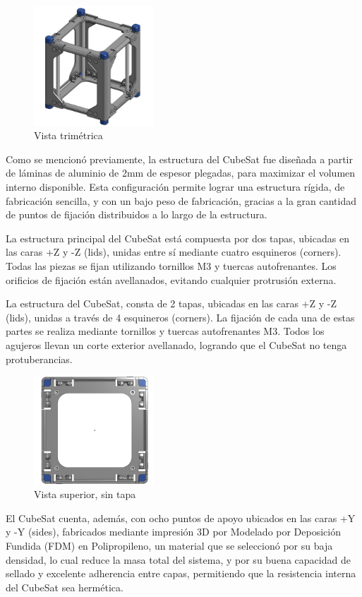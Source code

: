       \begin{figure}
        \centering
        \includegraphics[width=0.4\textwidth]{image/structure/partes.png}
        \caption{Vista trimétrica}
        \label{fig:trimetrica}
      \end{figure}
      Como se mencionó previamente, la estructura del CubeSat fue diseñada a partir de láminas de aluminio
      de 2mm de espesor plegadas, para maximizar el volumen interno disponible. Esta configuración permite
      lograr una estructura rígida, de fabricación sencilla, y con un bajo peso de fabricación, gracias a
      la gran cantidad de puntos de fijación distribuidos a lo largo de la estructura.

      La estructura principal del CubeSat está compuesta por dos tapas, ubicadas en las caras +Z y -Z
      (lids), unidas entre sí mediante cuatro esquineros (corners). Todas las piezas se fijan utilizando
      tornillos M3 y tuercas autofrenantes. Los orificios de fijación están avellanados, evitando cualquier
      protrusión externa.

      La estructura del CubeSat, consta de 2 tapas, ubicadas en las caras +Z y -Z (lids), unidas a través
      de 4 esquineros (corners). La fijación de cada una de estas partes se realiza mediante tornillos y
      tuercas autofrenantes M3. Todos los agujeros llevan un corte exterior avellanado, logrando que el
      CubeSat no tenga protuberancias.

      \begin{figure}
        \centering
        \includegraphics[width=0.4\textwidth]{image/structure/superior.png}
        \caption{Vista superior, sin tapa}
        \label{fig:superior}
      \end{figure}
      El CubeSat cuenta, además, con ocho puntos de apoyo ubicados en las caras +Y y -Y (sides),
      fabricados mediante impresión 3D por Modelado por Deposición Fundida (FDM) en Polipropileno, un
      material que se seleccionó por su baja densidad, lo cual reduce la masa total del sistema, y por
      su buena capacidad de sellado y excelente adherencia entre capas, permitiendo que la resistencia
      interna del CubeSat sea hermética.

